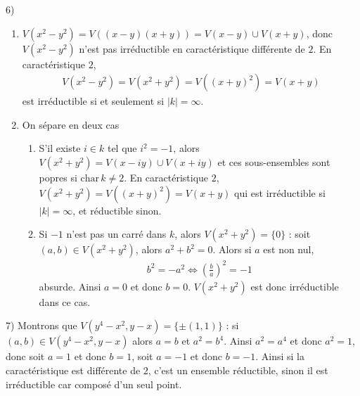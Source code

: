         \begin{question}{6)}
            \begin{enumerate}
                \item $V(x^2 - y^2) = V((x - y)(x + y)) = V(x - y) \cup V(x + y)$, donc $V(x^2 - y^2)$ n'est pas irréductible en caractéristique différente de $2$. En caractéristique $2$,
                \begin{align*}
                    V(x^2 - y^2) = V(x^2 + y^2) = V((x + y)^2) = V(x + y)
                \end{align*}
                est irréductible si et seulement si $|k| = \infty$.
                \item On sépare en deux cas
                \begin{enumerate}
                    \item S'il existe $i \in k$ tel que $i^2 = -1$, alors $V(x^2 + y^2) = V(x - iy) \cup V(x + iy)$ et ces sous-ensembles sont popres si $\mathrm{char} \, k \neq 2$. En caractéristique $2$, $V(x^2 + y^2) = V((x + y)^2) = V(x + y)$ qui est irréductible si $|k| = \infty$, et réductible sinon.
                    \item Si $-1$ n'est pas un carré dans $k$, alors $V(x^2 + y^2) = \{0\}$ : soit $(a,b) \in V(x^2 + y^2)$, alors $a^2 + b^2 = 0$. Alors si $a$ est non nul,
                    \begin{align*}
                        b^2 = -a^2 \iff \left( \frac{b}{a} \right)^2 = -1
                    \end{align*}
                    absurde. Ainsi $a = 0$ et donc $b = 0$. $V(x^2 + y^2)$ est donc irréductible dans ce cas. 
                \end{enumerate}
            \end{enumerate}
        \end{question}
        \begin{question}{7)}
            Montrons que $V(y^4 - x^2, y - x) = \{\pm (1,1)\}$ : si $(a,b) \in V(y^4 - x^2, y - x)$ alors $a = b$ et $a^2 = b^4$. Ainsi $a^2 = a^4$ et donc $a^2 = 1$, donc soit $a = 1$ et donc $b = 1$, soit $a = -1$ et donc $b = -1$. Ainsi si la caractéristique est différente de $2$, c'est un ensemble réductible, sinon il est irréductible car composé d'un seul point.
        \end{question}

